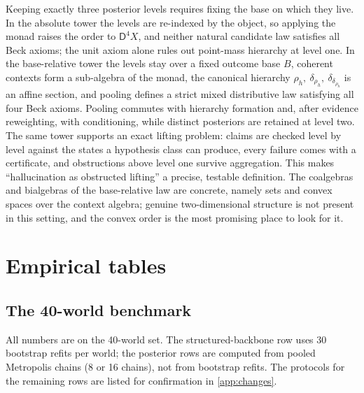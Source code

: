 \documentclass[11pt]{article}
\theoremstyle{definition}
\theoremstyle{remark}
\newcommand{\D}{\mathsf{D}}
\begin{document}
Keeping exactly three posterior levels requires fixing the base on which they live. In the
absolute tower the levels are re-indexed by the object, so applying the monad raises the order to
$\D^4X$, and neither natural candidate law satisfies all Beck axioms; the unit axiom alone rules out
point-mass hierarchy at level one. In the base-relative tower the levels stay over a fixed outcome
base $B$, coherent contexts form a sub-algebra of the monad, the canonical hierarchy
$\rho_h,\ \delta_{\rho_h},\ \delta_{\delta_{\rho_h}}$ is an affine section, and pooling defines a strict
mixed distributive law satisfying all four Beck axioms. Pooling commutes with hierarchy formation and, after evidence reweighting, with conditioning,
while distinct posteriors are retained at level two. The same tower supports an exact lifting
problem: claims are checked level by level against the states a hypothesis class can produce, every
failure comes with a certificate, and obstructions above level one survive aggregation. This makes
``hallucination as obstructed lifting'' a precise, testable definition. The coalgebras and
bialgebras of the base-relative law are concrete, namely sets and convex spaces over the context
algebra; genuine two-dimensional structure is not present in this setting, and the convex order is
the most promising place to look for it.

\appendix

\section{Empirical tables}\label{app:empirical}

\subsection{The 40-world benchmark}
All numbers are on the 40-world set. The structured-backbone row uses 30 bootstrap refits per
world; the posterior rows are computed from pooled Metropolis chains (8 or 16 chains), not from
bootstrap refits. The protocols for the remaining rows are listed for confirmation in
\cref{app:changes}.
\end{document}
